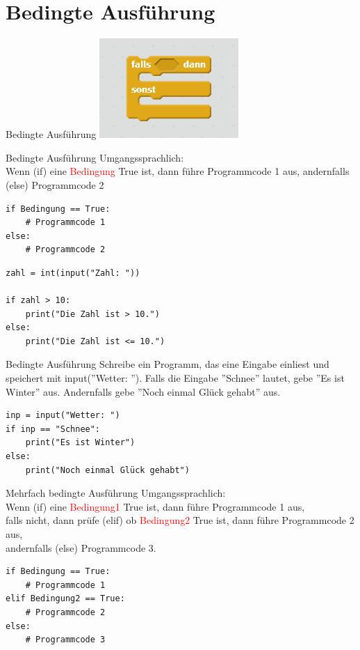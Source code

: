 \section{Bedingte Ausführung}

\begin{frame}{Bedingte Ausführung}
\centering\includegraphics[scale=1.0]{images/wenndann}
\end{frame}

\begin{frame}[fragile]{Bedingte Ausführung}
Umgangssprachlich:\\ Wenn (if) eine \textcolor{red}{Bedingung} True ist, dann führe Programmcode 1 aus, andernfalls (else) Programmcode 2\\

\begin{lstlisting}
if Bedingung == True:
	# Programmcode 1 
else:
	# Programmcode 2 
\end{lstlisting}

\begin{lstlisting}
zahl = int(input("Zahl: "))

if zahl > 10:
	print("Die Zahl ist > 10.")
else:
	print("Die Zahl ist <= 10.")
\end{lstlisting}
\end{frame}

\begin{frame}[fragile]{Bedingte Ausführung}
Schreibe ein Programm, das eine Eingabe einliest und speichert mit input(''Wetter: '').
Falls die Eingabe ''Schnee'' lautet, gebe ''Es ist Winter'' aus. Andernfalls gebe ''Noch einmal Glück gehabt'' aus.
\pause{}
\begin{lstlisting}
inp = input("Wetter: ")
if inp == "Schnee":
    print("Es ist Winter")
else:
    print("Noch einmal Glück gehabt")
\end{lstlisting}
\end{frame}

\begin{frame}[fragile]{Mehrfach bedingte Ausführung}
Umgangssprachlich:\\ Wenn (if) eine \textcolor{red}{Bedingung1} True ist, dann führe Programmcode 1 aus, \\falls nicht, dann prüfe (elif) ob \textcolor{red}{Bedingung2} True ist, dann führe Programmcode 2 aus, \\andernfalls (else) Programmcode 3.\\

\begin{lstlisting}
if Bedingung == True:
    # Programmcode 1
elif Bedingung2 == True:
    # Programmcode 2
else:
    # Programmcode 3
\end{lstlisting}
\end{frame}


